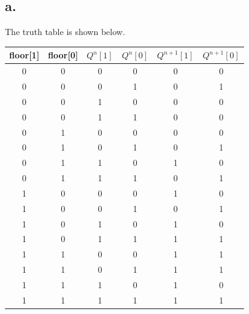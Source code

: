 \documentclass[11pt,a4paper]{article}
\begin{document}
	\subsection*{a.}
	The truth table is shown below.\par
	\begin{tabular}{cccc|cc}
		\hline 
		floor[1] & floor[0] & $Q^{n}[1]$ & $Q^{n}[0]$ & $Q^{n+1}[1]$ & $Q^{n+1}[0]$ \\ 
		\hline 
		0 & 0 & 0 & 0 & 0 & 0 \\ 
		\hline 
		0 & 0 & 0 & 1 & 0 & 1 \\ 
		\hline 
		0 & 0 & 1 & 0 & 0 & 0 \\ 
		\hline 
		0 & 0 & 1 & 1 & 0 & 0 \\ 
		\hline 
		0 & 1 & 0 & 0 & 0 & 0 \\ 
		\hline 
		0 & 1 & 0 & 1 & 0 & 1 \\ 
		\hline 
		0 & 1 & 1 & 0 & 1 & 0 \\ 
		\hline 
		0 & 1 & 1 & 1 & 0 & 1 \\ 
		\hline 
		1 & 0 & 0 & 0 & 1 & 0 \\ 
		\hline 
		1 & 0 & 0 & 1 & 0 & 1 \\ 
		\hline 
		1 & 0 & 1 & 0 & 1 & 0 \\ 
		\hline 
		1 & 0 & 1 & 1 & 1 & 1 \\ 
		\hline 
		1 & 1 & 0 & 0 & 1 & 1 \\ 
		\hline 
		1 & 1 & 0 & 1 & 1 & 1 \\ 
		\hline 
		1 & 1 & 1 & 0 & 1 & 0 \\ 
		\hline 
		1 & 1 & 1 & 1 & 1 & 1 \\ 
		\hline 
	\end{tabular} 
\end{document}
